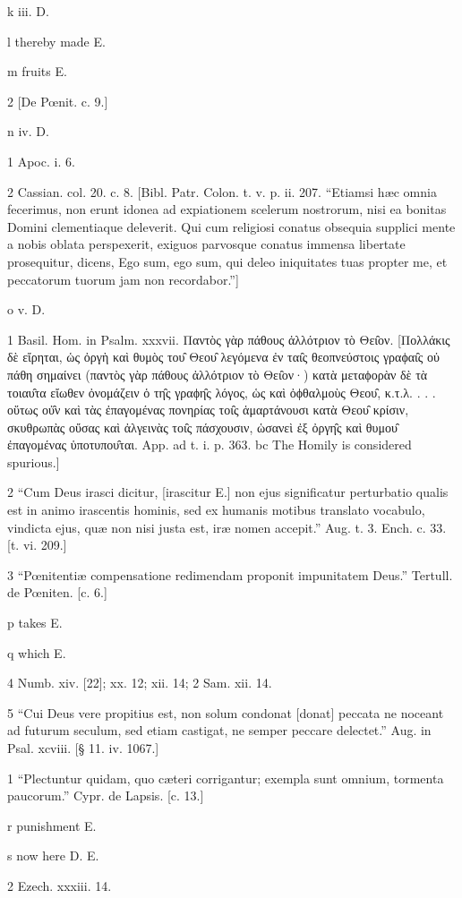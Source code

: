 k
iii. D.

l
thereby made E.

m
fruits E.

2
[De Pœnit. c. 9.]

n
iv. D.

1
Apoc. i. 6.

2
Cassian. col. 20. c. 8. [Bibl. Patr. Colon. t. v. p. ii. 207. “Etiamsi hæc omnia fecerimus, non erunt idonea ad expiationem scelerum nostrorum, nisi ea bonitas Domini clementiaque deleverit. Qui cum religiosi conatus obsequia supplici mente a nobis oblata perspexerit, exiguos parvosque conatus immensa libertate prosequitur, dicens, Ego sum, ego sum, qui deleo iniquitates tuas propter me, et peccatorum tuorum jam non recordabor.”]

o
v. D.

1
Basil. Hom. in Psalm. xxxvii. Παντὸς γὰρ πάθους ἀλλότριον τὸ Θει̑ον. [Πολλάκις δὲ εἴρηται, ὡς ὀργὴ καὶ θυμὸς του̑ Θεου̑ λεγόμενα ἐν ται̑ς θεοπνεύστοις γραϕαι̑ς οὐ πάθη σημαίνει (παντὸς γὰρ πάθους ἀλλότριον τὸ Θει̑ον·) κατὰ μεταϕορὰν δὲ τὰ τοιαυ̑τα εἴωθεν ὀνομάζειν ὁ τη̑ς γραϕη̑ς λόγος, ὡς καὶ ὀϕθαλμοὺς Θεου̑, κ.τ.λ. . . . οὕτως οὐ̑ν καὶ τὰς ἐπαγομένας πονηρίας τοι̑ς ἁμαρτάνουσι κατὰ Θεου̑ κρίσιν, σκυθρωπὰς οὔσας καὶ ἀλγεινὰς τοι̑ς πάσχουσιν, ὡσανεὶ ἐξ ὀργη̑ς καὶ θυμου̑ ἐπαγομένας ὑποτυπου̑ται. App. ad t. i. p. 363. bc The Homily is considered spurious.]

2
“Cum Deus irasci dicitur, [irascitur E.] non ejus significatur perturbatio qualis est in animo irascentis hominis, sed ex humanis motibus translato vocabulo, vindicta ejus, quæ non nisi justa est, iræ nomen accepit.” Aug. t. 3. Ench. c. 33. [t. vi. 209.]

3
“Pœnitentiæ compensatione redimendam proponit impunitatem Deus.” Tertull. de Pœniten. [c. 6.]

p
takes E.

q
which E.

4
Numb. xiv. [22]; xx. 12; xii. 14; 2 Sam. xii. 14.

5
“Cui Deus vere propitius est, non solum condonat [donat] peccata ne noceant ad futurum seculum, sed etiam castigat, ne semper peccare delectet.” Aug. in Psal. xcviii. [§ 11. iv. 1067.]

1
“Plectuntur quidam, quo cæteri corrigantur; exempla sunt omnium, tormenta paucorum.” Cypr. de Lapsis. [c. 13.]

r
punishment E.

s
now here D. E.

2
Ezech. xxxiii. 14.

